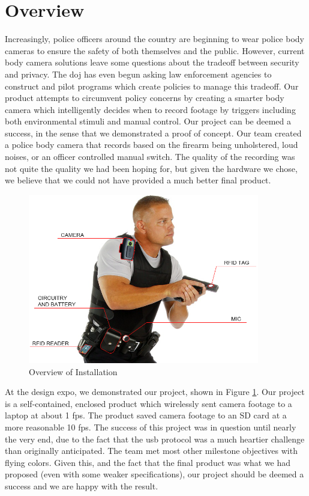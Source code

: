 \documentclass[12pt]{article}
\begin{document}
\section{Overview}
Increasingly, police officers around the country are beginning to wear police
body cameras to ensure the safety of both themselves and the public. However,
current body camera solutions leave some questions about the tradeoff between
security and privacy. The \gls{doj} has even begun asking law enforcement
agencies to construct and pilot programs which create policies to manage this
tradeoff\cite{officer_privacy}. Our product attempts to circumvent policy
concerns by creating a smarter body camera which intelligently decides when to
record footage by triggers including both environmental stimuli and manual
control.  Our project can be deemed a success, in the sense that we
demonstrated a proof of concept. Our team created a police body camera that
records based on the firearm being unholstered, loud noises, or an officer
controlled manual switch.  The quality of the recording was not quite the
quality we had been hoping for, but given the hardware we chose, we believe
that we could not have provided a much better final product. 

\begin{figure}[h]
    \centering
    \includegraphics[width=0.9\textwidth]{installation}
    \caption{Overview of Installation}
    \label{fig:installation}
\end{figure}

At the design expo, we demonstrated our project, shown in Figure
\ref{fig:installation}.  Our project is a self-contained, enclosed product
which wirelessly sent camera footage to a laptop at about 1 \gls{fps}. The
product saved camera footage to an SD card at a more reasonable 10 \gls{fps}.
The success of this project was in question until nearly the very end, due to
the fact that the \gls{usb} protocol was a much heartier challenge than
originally anticipated. The team met most other milestone objectives with
flying colors. Given this, and the fact that the final product was what we had
proposed (even with some weaker specifications), our project should be deemed a
success and we are happy with the result.
\end{document}
